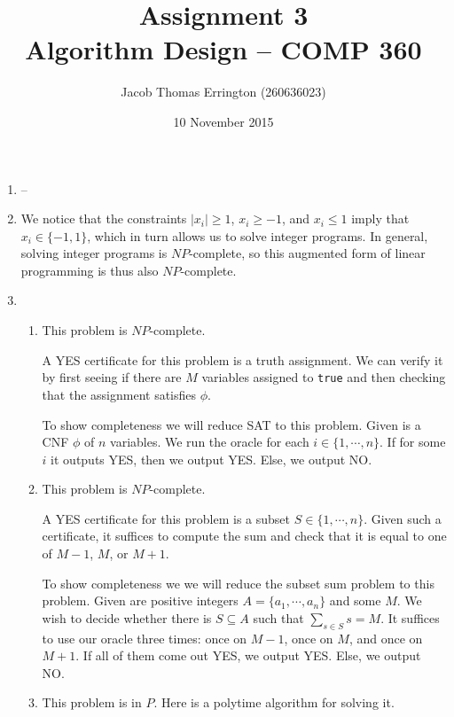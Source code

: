 \documentclass[letterpaper,11pt]{article}
\author{Jacob Thomas Errington (260636023)}
\title{Assignment 3\\Algorithm Design -- COMP 360}
\date{10 November 2015}
\begin{document}
\begin{enumerate}
    \item
        --

    \item
        We notice that the constraints $|x_i| \geq 1$, $x_i \geq -1$, and
        $x_i \leq 1$ imply that $x_i \in \{-1, 1\}$, which in turn allows us to
        solve integer programs. In general, solving integer programs is
        $NP$-complete, so this augmented form of linear programming is thus
        also $NP$-complete.

    \item
        \begin{enumerate}
            \item
                This problem is $NP$-complete.

                A YES certificate for this problem is a truth assignment. We
                can verify it by first seeing if there are $M$ variables
                assigned to \texttt{true} and then checking that the assignment
                satisfies $\phi$.

                To show completeness we will reduce SAT to this problem. Given
                is a CNF $\phi$ of $n$ variables. We run the oracle for each 
                $i \in \{1, \cdots, n\}$. If for some $i$ it outputs YES, then
                we output YES. Else, we output NO.

            \item
                This problem is $NP$-complete.

                A YES certificate for this problem is a subset
                $S \in \{1, \cdots, n\}$. Given such a certificate, it suffices
                to compute the sum and check that it is equal to one of 
                $M - 1$, $M$, or $M + 1$.

                To show completeness we we will reduce the subset sum problem
                to this problem. Given are positive integers
                $A = \{a_1, \cdots, a_n\}$ and some $M$. We wish to decide
                whether there is $S \subseteq A$ such that
                $\sum_{s \in S} s = M$. It suffices to use our oracle three
                times: once on $M-1$, once on $M$, and once on $M+1$.
                If all of them come out YES, we output YES. Else, we
                output NO.

            \item
                This problem is in $P$. Here is a polytime algorithm for
                solving it.


\end{enumerate}
\end{enumerate}
\end{document}
